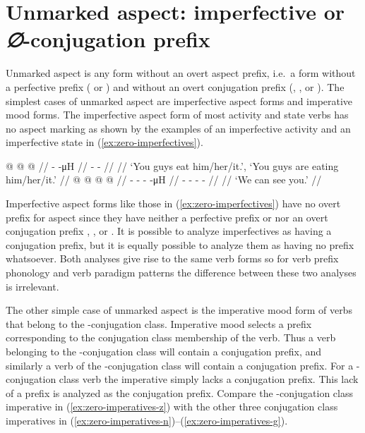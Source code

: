 \clearpage
\section{Unmarked aspect: imperfective or \textit{∅}-conjugation prefix}\label{sec:zero}

\begin{multicols}{2}
\noindent
Unmarked aspect is any form without an overt aspect prefix, i.e.\ a form without a perfective prefix ( or ) and without an overt conjugation prefix (, , or ).
The simplest cases of unmarked aspect are imperfective aspect forms and imperative mood forms.
The imperfective aspect form of most activity and state verbs has no aspect marking as shown by the examples of an imperfective activity and an imperfective state in (\ref{ex:zero-imperfectives}).

\pex\label{ex:zero-imperfectives}%
\a\label{ex:zero-imperfectives-activity}%
%
\begingl
	\gla	{} @ {} @ {} @ {} //
	\glb	{} -  -μH //
	\glc	{} -  - //
	\gld	{} {} {} {} //
	\glft	‘You guys eat him/her/it.’, ‘You guys are eating him/her/it.’
		//
\endgl
\a\label{ex:zero-imperfectives-state}%
%
\begingl
	\gla	{} @ {} @ {} @ {} @ {} //
	\glb	{}- - -  -μH //
	\glc	{}- - -  - //
	\gld	{} {} {} {} {} {} //
	\glft	‘We can see you.’
		//
\endgl
\xe

Imperfective aspect forms like those in (\ref{ex:zero-imperfectives}) have no overt prefix for aspect since they have neither a perfective prefix  or  nor an overt conjugation prefix , , or .
It is possible to analyze imperfectives as having a  conjugation prefix, but it is equally possible to analyze them as having no prefix whatsoever.
Both analyses give rise to the same verb forms so for verb prefix phonology and verb paradigm patterns the difference between these two analyses is irrelevant.

The other simple case of unmarked aspect is the imperative mood form of verbs that belong to the -conjugation class.
Imperative mood selects a prefix corresponding to the conjugation class membership of the verb.
Thus a verb belonging to the -conjugation class will contain a  conjugation prefix, and similarly a verb of the -conjugation class will contain a  conjugation prefix.
For a -conjugation class verb the imperative simply lacks a conjugation prefix.
This lack of a prefix is analyzed as the  conjugation prefix.
Compare the -conjugation class imperative in (\ref{ex:zero-imperatives-z}) with the other three conjugation class imperatives in (\ref{ex:zero-imperatives-n})–(\ref{ex:zero-imperatives-g}).


\end{multicols}
